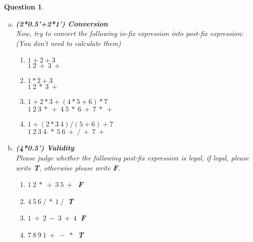 \documentclass{article}
\newtheorem{Q}{Question}
\begin{document}
\begin{Q}
\begin{enumerate}[(a)]
		\item \textbf{(2*0.5'+2*1') Conversion}\\
		      Now, try to convert the following in-fix expression into post-fix expression: (You don't need to calculate them)\\
		      \begin{enumerate}[1) ]
			      \item $ 1+2+3 $\\
			            $1\ 2\ +\ 3\ +$    \\
			      \item $ 1*2+3 $\\
			            $1\ 2\ *\ 3\ +$\\
			      \item $ 1 + 2*3 + (4 * 5 + 6) * 7 $\\
			            $1\ 2\ 3\ *\ +\ 4\ 5\ *\ 6\ +\ 7\ *\ +$\\
			      \item $ 1 + (2*3  \hat\   4) /(5+6)+7$\\
			            $1\ 2\ 3\ 4\ \hat\ *\ 5\ 6\ +\ /\ +\ 7\ +$\\
		      \end{enumerate}
		\item \textbf{(4*0.5') Validity}\\
		      Please judge whether the following post-fix expression is legal, if legal, please write \textbf{T}, otherwise please write \textbf{F}.
		      \begin{enumerate}
			      \item $ 1\ 2\ *\ +\ 3\ 5\ +\ $	\textbf{F}
			      \item $ 4\ 5\ 6\ /\ *\ 1\ /\ $ 	\textbf{T}
			      \item $ 1\ +\ 2\ -\ 3\ +\ 4\ $ 	\textbf{F}
			      \item $ 7\ 8\ 9\ 1\ +\ -\ *\ $ 	\textbf{T}
		      \end{enumerate}
	\end{enumerate}
\end{Q}
\pagebreak
\end{document}
